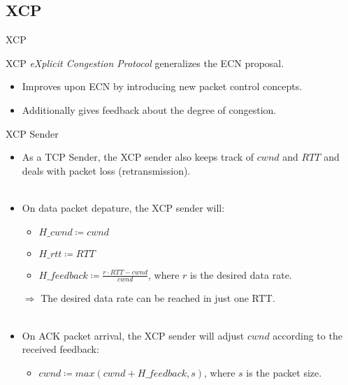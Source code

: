 \documentclass[english,aspectratio=43,t]{beamer}
\begin{document}
\subsection{XCP}
\label{sec:xcp}
\begin{frame}{XCP}
~\\
\begin{block}{XCP}
\textit{eXplicit Congestion Protocol} generalizes the ECN proposal.
\end{block}
\begin{itemize}
\item Improves upon ECN by introducing new packet control concepts.
\item Additionally gives feedback about the degree of congestion.
\end{itemize}
\end{frame}

\begin{frame}{XCP Sender}
\begin{itemize}
\item As a TCP Sender, the XCP sender also keeps track of $cwnd$ and $RTT$ and deals with packet loss (retransmission).
~\\~\\
\item On data packet depature, the XCP sender will:
	\begin{itemize}
	\item $H\_cwnd \coloneqq cwnd$
	\item $H\_rtt \coloneqq RTT$
	\item $H\_feedback \coloneqq \frac{r \cdot RTT - cwnd}{cwnd}$, where $r$ is the desired data rate.
	\end{itemize}
\item[$\Rightarrow$] The desired data rate can be reached in just one RTT.
~\\~\\
\item On ACK packet arrival, the XCP sender will adjust $cwnd$ according to the received feedback:
	\begin{itemize}
	\item $cwnd \coloneqq max(cwnd + H\_feedback, s)$, where $s$ is the packet size.
	\end{itemize}
\end{itemize}
\end{frame}
\end{document}
